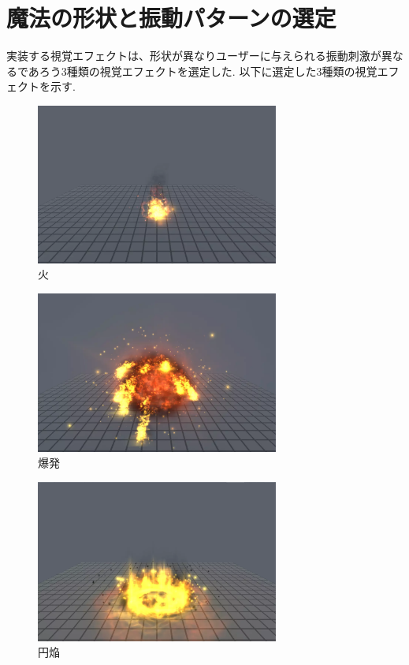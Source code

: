 \section{魔法の形状と振動パターンの選定}
実装する視覚エフェクトは、形状が異なりユーザーに与えられる振動刺激が異なるであろう3種類の視覚エフェクトを選定した.
以下に選定した3種類の視覚エフェクトを示す.
\begin{figure}[h]
\centering
\includegraphics[clip,width=8cm]{./fig/firefire.png}
\caption{火}\label{fire}
\end{figure}

\begin{figure}[h]
\centering
\includegraphics[clip,width=8cm]{./fig/explosion.png}
\caption{爆発}\label{explosion}
\end{figure}

\begin{figure}[h]
\centering
\includegraphics[clip,width=8cm]{./fig/ringfire.png}
\caption{円焔}\label{ringfire}
\end{figure}


